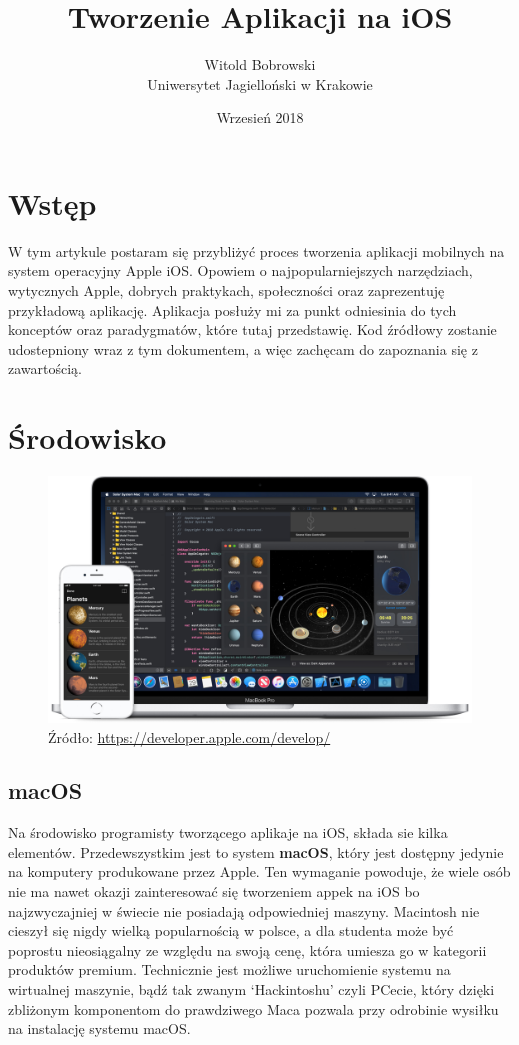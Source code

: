\documentclass{article}
\title{Tworzenie Aplikacji na iOS}
\author{Witold Bobrowski\\Uniwersytet Jagielloński w Krakowie}
\date{Wrzesień 2018}
\begin{document}
\maketitle

%
%
\section*{Wstęp}
W tym artykule postaram się przybliżyć proces tworzenia aplikacji
mobilnych na system operacyjny Apple iOS\@. Opowiem o najpopularniejszych 
narzędziach, wytycznych Apple, dobrych praktykach, społeczności oraz 
zaprezentuję przykładową aplikację. Aplikacja posłuży mi za punkt odniesinia 
do tych konceptów oraz paradygmatów, które tutaj przedstawię. Kod źródłowy 
zostanie udostepniony wraz z tym dokumentem, a więc zachęcam do zapoznania się 
z zawartością.


%
%
\section*{Środowisko}

\begin{figure}[h]
\centering
\includegraphics[width=12cm]{image-develop-hero-large_2x}
\caption{Źródło: \url{https://developer.apple.com/develop/}}
\end{figure}

\subsection*{macOS}
Na środowisko programisty tworzącego aplikaje na iOS, składa sie kilka elementów.
Przedewszystkim jest to system \textbf{macOS}, który jest dostępny jedynie na 
komputery produkowane przez Apple. Ten wymaganie powoduje, że wiele osób nie ma
nawet okazji zainteresować się tworzeniem appek na iOS bo najzwyczajniej w świecie
nie posiadają odpowiedniej maszyny. Macintosh nie cieszył się nigdy wielką
popularnością w polsce, a dla studenta może być poprostu nieosiągalny ze względu
na swoją cenę, która umiesza go w kategorii produktów premium. Technicznie jest
możliwe uruchomienie systemu na wirtualnej maszynie, bądź tak zwanym `Hackintoshu'
czyli PCecie, który dzięki zbliżonym komponentom do prawdziwego Maca pozwala przy
odrobinie wysiłku na instalację systemu macOS\@.
\end{document}
